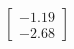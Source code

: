 \documentclass[preview]{standalone}
\begin{document}
\begin{align*}
\begin{bmatrix} -1.19 \\ -2.68 \end{bmatrix}
\end{align*}
\end{document}
